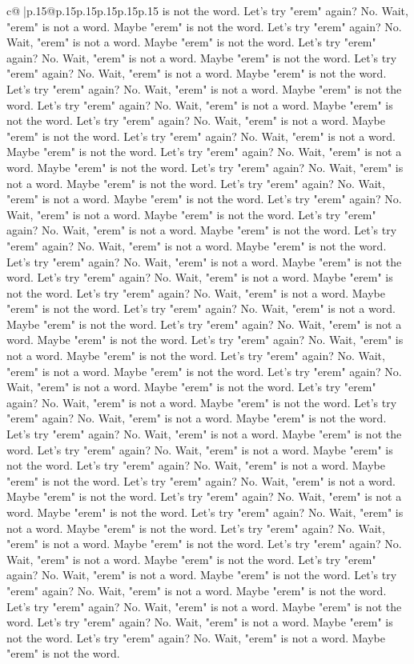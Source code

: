 \documentclass{article}
\begin{document}
{\begin{supertabular}{c@{$\;$}|p{.15\linewidth}@{}p{.15\linewidth}p{.15\linewidth}p{.15\linewidth}p{.15\linewidth}p{.15\linewidth}}
{{{is not the word. Let's try "erem" again? No. Wait, "erem" is not a word. Maybe "erem" is not the word. Let's try "erem" again? No. Wait, "erem" is not a word. Maybe "erem" is not the word. Let's try "erem" again? No. Wait, "erem" is not a word. Maybe "erem" is not the word. Let's try "erem" again? No. Wait, "erem" is not a word. Maybe "erem" is not the word. Let's try "erem" again? No. Wait, "erem" is not a word. Maybe "erem" is not the word. Let's try "erem" again? No. Wait, "erem" is not a word. Maybe "erem" is not the word. Let's try "erem" again? No. Wait, "erem" is not a word. Maybe "erem" is not the word. Let's try "erem" again? No. Wait, "erem" is not a word. Maybe "erem" is not the word. Let's try "erem" again? No. Wait, "erem" is not a word. Maybe "erem" is not the word. Let's try "erem" again? No. Wait, "erem" is not a word. Maybe "erem" is not the word. Let's try "erem" again? No. Wait, "erem" is not a word. Maybe "erem" is not the word. Let's try "erem" again? No. Wait, "erem" is not a word. Maybe "erem" is not the word. Let's try "erem" again? No. Wait, "erem" is not a word. Maybe "erem" is not the word. Let's try "erem" again? No. Wait, "erem" is not a word. Maybe "erem" is not the word. Let's try "erem" again? No. Wait, "erem" is not a word. Maybe "erem" is not the word. Let's try "erem" again? No. Wait, "erem" is not a word. Maybe "erem" is not the word. Let's try "erem" again? No. Wait, "erem" is not a word. Maybe "erem" is not the word. Let's try "erem" again? No. Wait, "erem" is not a word. Maybe "erem" is not the word. Let's try "erem" again? No. Wait, "erem" is not a word. Maybe "erem" is not the word. Let's try "erem" again? No. Wait, "erem" is not a word. Maybe "erem" is not the word. Let's try "erem" again? No. Wait, "erem" is not a word. Maybe "erem" is not the word. Let's try "erem" again? No. Wait, "erem" is not a word. Maybe "erem" is not the word. Let's try "erem" again? No. Wait, "erem" is not a word. Maybe "erem" is not the word. Let's try "erem" again? No. Wait, "erem" is not a word. Maybe "erem" is not the word. Let's try "erem" again? No. Wait, "erem" is not a word. Maybe "erem" is not the word. Let's try "erem" again? No. Wait, "erem" is not a word. Maybe "erem" is not the word. Let's try "erem" again? No. Wait, "erem" is not a word. Maybe "erem" is not the word. Let's try "erem" again? No. Wait, "erem" is not a word. Maybe "erem" is not the word. Let's try "erem" again? No. Wait, "erem" is not a word. Maybe "erem" is not the word. Let's try "erem" again? No. Wait, "erem" is not a word. Maybe "erem" is not the word. Let's try "erem" again? No. Wait, "erem" is not a word. Maybe "erem" is not the word. Let's try "erem" again? No. Wait, "erem" is not a word. Maybe "erem" is not the word. Let's try "erem" again? No. Wait, "erem" is not a word. Maybe "erem" is not the word. Let's try "erem" again? No. Wait, "erem" is not a word. Maybe "erem" is not the word. Let's try "erem" again? No. Wait, "erem" is not a word. Maybe "erem" is not the word. Let's try "erem" again? No. Wait, "erem" is not a word. Maybe "erem" is not the word. Let's try "erem" again? No. Wait, "erem" is not a word. Maybe "erem" is not the word. }}}
\end{supertabular}}
\end{document}
